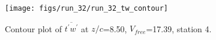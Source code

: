 \begin{figure}[H]
\centering
\texttt{[image: figs/run\_32/run\_32\_tw\_contour]}
\caption{Contour plot of $\overline{t^\prime w^\prime}$ at $z/c$=8.50, $V_{free}$=17.39, station 4.}
\label{fig:run_32_tw_contour}
\end{figure}


